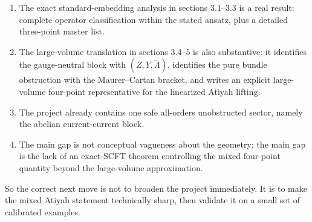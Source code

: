 \documentclass[11pt]{article}
\newcommand{\wt}[1]{\widetilde{#1}}
\begin{document}
\begin{enumerate}
\item The exact standard-embedding analysis in sections 3.1--3.3 is a real result: complete operator classification within the stated ansatz, plus a detailed three-point master list.
\item The large-volume translation in sections 3.4--5 is also substantive: it identifies the gauge-neutral block with $(Z,Y,\wt\Lambda)$, identifies the pure bundle obstruction with the Maurer--Cartan bracket, and writes an explicit large-volume four-point representative for the linearized Atiyah lifting.
\item The project already contains one safe all-orders unobstructed sector, namely the abelian current-current block.
\item The main gap is not conceptual vagueness about the geometry; the main gap is the lack of an exact-SCFT theorem controlling the mixed four-point quantity beyond the large-volume approximation.
\end{enumerate}

So the correct next move is not to broaden the project immediately. It is to make the mixed Atiyah statement technically sharp, then validate it on a small set of calibrated examples.
\end{document}
